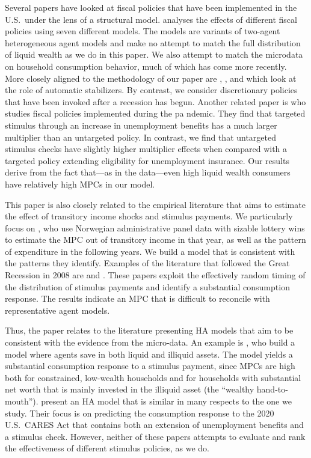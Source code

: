 \documentclass[\econtexRoot/HAFiscal]{subfiles}
\begin{document}
Several papers have looked at fiscal policies that have been implemented in the U.S.\ under the lens of a structural model. \cite{coenen2012effects} analyses the effects of different fiscal policies using seven different models. The models are variants of two-agent heterogeneous agent models and make no attempt to match the full distribution of liquid wealth as we do in this paper. We also attempt to match the microdata on household consumption behavior, much of which has come more recently.  More closely aligned to the methodology of our paper are \cite{mckay2016role}, \cite{mckay2021optimal}, and \cite{phan2024welfare} which look at the role of automatic stabilizers. By contrast, we consider discretionary policies that have been invoked after a recession has begun. Another related paper is \cite{bayercoronavirus} who studies fiscal policies implemented during the pa  ndemic. They find that targeted stimulus through an increase in unemployment benefits has a much larger multiplier than an untargeted policy. In contrast, we find that untargeted stimulus checks have slightly higher multiplier effects when compared with a targeted policy extending eligibility for unemployment insurance. Our results derive from the fact that---as in the data---even high liquid wealth consumers have relatively high MPCs in our model.

This paper is also closely related to the empirical literature that aims to estimate the effect of transitory income shocks and stimulus payments. We particularly focus on \cite{fagereng_mpc_2021}, who use Norwegian administrative panel data with sizable lottery wins to estimate the MPC out of transitory income in that year, as well as the pattern of expenditure in the following years. We build a model that is consistent with the patterns they identify. Examples of the literature that followed the Great Recession in 2008 are \cite{parker2013consumer} and \cite{broda2014economic}. These papers exploit the effectively random timing of the distribution of stimulus payments and identify a substantial consumption response. The results indicate an MPC that is difficult to reconcile with representative agent models.

Thus, the paper relates to the literature presenting HA models that aim to be consistent with the evidence from the micro-data. An example is \cite{kaplan2014model}, who build a model where agents save in both liquid and illiquid assets. The model yields a substantial consumption response to a stimulus payment, since MPCs are high both for constrained, low-wealth households and for households with substantial net worth that is mainly invested in the illiquid asset (the ``wealthy hand-to-mouth''). \cite{carroll2020modeling} present an HA model that is similar in many respects to the one we study. Their focus is on predicting the consumption response to the 2020 U.S.\ CARES Act that contains both an extension of unemployment benefits and a stimulus check. However, neither of these papers attempts to evaluate and rank the effectiveness of different stimulus policies, as we do.
\end{document}
